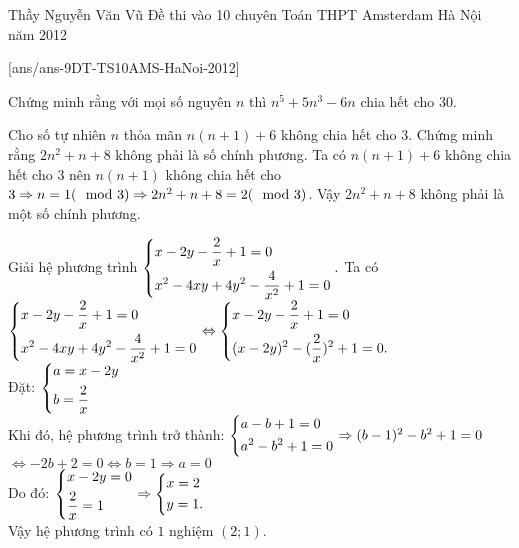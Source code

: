 \begin{name}
{Thầy  Nguyễn Văn Vũ}
{Đề thi vào 10 chuyên Toán THPT Amsterdam Hà Nội năm 2012}
\end{name}
\setcounter{ex}{0}
[ans/ans-9DT-TS10AMS-HaNoi-2012]
\begin{ex}%
Chứng minh rằng với mọi số nguyên $n$ thì $n^{5}+5n^{3}-6n$ chia hết cho $30$.
\end{ex}
\begin{ex}%
Cho số tự nhiên $n$ thỏa mãn $n(n+1)+6$ không chia hết cho $3$. Chứng minh rằng $2n^{2} +n+8$ không phải là số chính phương.
\loigiai
    {
Ta có $n(n+1)+6$ không chia hết cho $3$ nên $n(n+1)$ không chia hết cho $3 \Rightarrow n=1(\mod 3)\Rightarrow\\
 2n^{2}+n+8=2(\mod 3)$.
    Vậy $2n^{2}+n+8$ không phải là một số chính phương.
     }
\end{ex}
\begin{ex}%
Giải hệ phương trình $\left\{\begin{aligned}&x-2y-\dfrac{2}{x}+1=0\\&x^2-4xy+4y^{2}-\dfrac{4}{x^{2}}+1=0\end{aligned}\right..$
\loigiai
    {
 Ta có  $\left\{\begin{aligned}&x-2y-\dfrac{2}{x}+1=0\\&x^2-4xy+4y^{2}-\dfrac{4}{x^{2}}+1=0\end{aligned}\right.\Leftrightarrow \left\{\begin{aligned}&x-2y-\dfrac{2}{x}+1=0\\&(x-2y)^{2}-(\dfrac{2}{x})^{2}+1=0.\end{aligned}\right.$\\
Đặt: $\left\{\begin{aligned}&a=x-2y\\&b=\dfrac{2}{x}\end{aligned}\right.$\\
Khi đó, hệ phương trình trở thành:
$\left\{\begin{aligned}&a-b+1=0\\&a^{2}-b^{2}+1=0\end{aligned}\right.\Rightarrow (b-1)^{2}-b^{2}+1=0$\\
$\Leftrightarrow-2b+2=0\Leftrightarrow b=1 \Rightarrow a=0$\\
Do đó: $\left\{\begin{aligned}&x-2y=0\\&\dfrac{2}{x}=1\end{aligned}\right.\Rightarrow \left\{\begin{aligned}&x=2\\&y=1.\end{aligned}\right.$\\
Vậy hệ phương trình có $1$ nghiệm $(2;1).$
    }
\end{ex}
